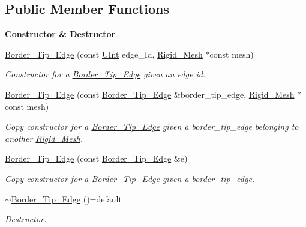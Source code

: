 \subsection*{Public Member Functions}
\begin{Indent}{\bf Constructor \& Destructor}\par
\begin{DoxyCompactItemize}
\item 
\hyperlink{classFVCode3D_1_1Rigid__Mesh_1_1Border__Tip__Edge_ab533abba01ed6878748be717d830df17}{Border\+\_\+\+Tip\+\_\+\+Edge} (const \hyperlink{namespaceFVCode3D_a4bf7e328c75d0fd504050d040ebe9eda}{U\+Int} edge\+\_\+\+Id, \hyperlink{classFVCode3D_1_1Rigid__Mesh}{Rigid\+\_\+\+Mesh} $\ast$const mesh)
\begin{DoxyCompactList}\small\item\em Constructor for a \hyperlink{classFVCode3D_1_1Rigid__Mesh_1_1Border__Tip__Edge}{Border\+\_\+\+Tip\+\_\+\+Edge} given an edge id. \end{DoxyCompactList}\item 
\hyperlink{classFVCode3D_1_1Rigid__Mesh_1_1Border__Tip__Edge_a69d258bd9bd9c92de2d024cbb4905d32}{Border\+\_\+\+Tip\+\_\+\+Edge} (const \hyperlink{classFVCode3D_1_1Rigid__Mesh_1_1Border__Tip__Edge}{Border\+\_\+\+Tip\+\_\+\+Edge} \&border\+\_\+tip\+\_\+edge, \hyperlink{classFVCode3D_1_1Rigid__Mesh}{Rigid\+\_\+\+Mesh} $\ast$const mesh)
\begin{DoxyCompactList}\small\item\em Copy constructor for a \hyperlink{classFVCode3D_1_1Rigid__Mesh_1_1Border__Tip__Edge}{Border\+\_\+\+Tip\+\_\+\+Edge} given a border\+\_\+tip\+\_\+edge belonging to another \hyperlink{classFVCode3D_1_1Rigid__Mesh}{Rigid\+\_\+\+Mesh}. \end{DoxyCompactList}\item 
\hyperlink{classFVCode3D_1_1Rigid__Mesh_1_1Border__Tip__Edge_a204a7c45f87f16fb4fa940032e2589f0}{Border\+\_\+\+Tip\+\_\+\+Edge} (const \hyperlink{classFVCode3D_1_1Rigid__Mesh_1_1Border__Tip__Edge}{Border\+\_\+\+Tip\+\_\+\+Edge} \&e)
\begin{DoxyCompactList}\small\item\em Copy constructor for a \hyperlink{classFVCode3D_1_1Rigid__Mesh_1_1Border__Tip__Edge}{Border\+\_\+\+Tip\+\_\+\+Edge} given a border\+\_\+tip\+\_\+edge. \end{DoxyCompactList}\item 
\hyperlink{classFVCode3D_1_1Rigid__Mesh_1_1Border__Tip__Edge_a4c41ab5ef6ba56c076a291af85528c2b}{$\sim$\+Border\+\_\+\+Tip\+\_\+\+Edge} ()=default
\begin{DoxyCompactList}\small\item\em Destructor. \end{DoxyCompactList}\end{DoxyCompactItemize}
\end{Indent}
